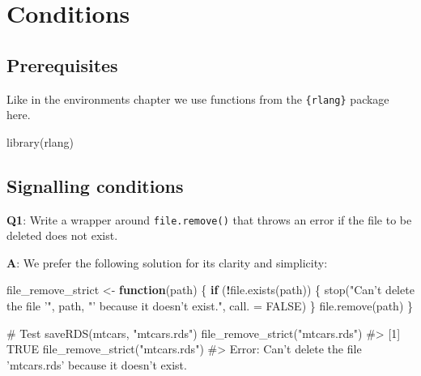 \documentclass[
]{krantz}
\makeatletter
\newenvironment{Shaded}{\begin{snugshade}}{\end{snugshade}}
\newcommand{\CommentTok}[1]{\textcolor[rgb]{0.56,0.35,0.01}{\textit{#1}}}
\newcommand{\ControlFlowTok}[1]{\textcolor[rgb]{0.13,0.29,0.53}{\textbf{#1}}}
\newcommand{\DataTypeTok}[1]{\textcolor[rgb]{0.13,0.29,0.53}{#1}}
\newcommand{\KeywordTok}[1]{\textcolor[rgb]{0.13,0.29,0.53}{\textbf{#1}}}
\newcommand{\NormalTok}[1]{#1}
\newcommand{\OperatorTok}[1]{\textcolor[rgb]{0.81,0.36,0.00}{\textbf{#1}}}
\newcommand{\OtherTok}[1]{\textcolor[rgb]{0.56,0.35,0.01}{#1}}
\newcommand{\StringTok}[1]{\textcolor[rgb]{0.31,0.60,0.02}{#1}}
\newenvironment{kframe}{%
\medskip{}
\setlength{\fboxsep}{.8em}
 \def\at@end@of@kframe{}%
 \ifinner\ifhmode%
  \def\at@end@of@kframe{\end{minipage}}%
  \begin{minipage}{\columnwidth}%
 \fi\fi%
 \def\FrameCommand##1{\hskip\@totalleftmargin \hskip-\fboxsep
 \colorbox{shadecolor}{##1}\hskip-\fboxsep
     \hskip-\linewidth \hskip-\@totalleftmargin \hskip\columnwidth}%
 \MakeFramed {\advance\hsize-\width
   \@totalleftmargin\z@ \linewidth\hsize
   \@setminipage}}%
 {\par\unskip\endMakeFramed%
 \at@end@of@kframe}
\renewenvironment{Shaded}{\begin{kframe}}{\end{kframe}}
\renewcommand{\KeywordTok} [1]{\textcolor[rgb]{0.00,0.44,0.13}{{#1}}}
\renewcommand{\DataTypeTok}[1]{\textcolor[rgb]{0.56,0.13,0.00}{{#1}}}
\renewcommand{\StringTok}  [1]{\textcolor[rgb]{0.25,0.44,0.63}{{#1}}}
\renewcommand{\CommentTok} [1]{\textcolor[rgb]{0.38,0.63,0.69}{{#1}}}
\renewcommand{\OtherTok}   [1]{\textcolor[rgb]{0.00,0.44,0.13}{{#1}}}
\renewcommand{\NormalTok}  [1]{{#1}}
\makeatother
\begin{document}
\hypertarget{conditions}{%
\chapter{Conditions}\label{conditions}}

\hypertarget{prerequisites-2}{%
\section*{Prerequisites}\label{prerequisites-2}}


Like in the environments chapter we use functions from the \texttt{\{rlang\}} package here.

\begin{Shaded}
\begin{Highlighting}[]
\KeywordTok{library}\NormalTok{(rlang)}
\end{Highlighting}
\end{Shaded}


\hypertarget{signalling-conditions}{%
\section{Signalling conditions}\label{signalling-conditions}}

\textbf{{Q1}}: Write a wrapper around \texttt{file.remove()} that throws an error if the file to be deleted does not exist.

\textbf{{A}}: We prefer the following solution for its clarity and simplicity:

\begin{Shaded}
\begin{Highlighting}[]
\NormalTok{file_remove_strict <-}\StringTok{ }\ControlFlowTok{function}\NormalTok{(path) \{}
  \ControlFlowTok{if}\NormalTok{ (}\OperatorTok{!}\KeywordTok{file.exists}\NormalTok{(path)) \{}
    \KeywordTok{stop}\NormalTok{(}\StringTok{"Can't delete the file '"}\NormalTok{, path, }\StringTok{"' because it doesn't exist."}\NormalTok{,}
         \DataTypeTok{call. =} \OtherTok{FALSE}\NormalTok{)}
\NormalTok{  \}}
  \KeywordTok{file.remove}\NormalTok{(path)}
\NormalTok{\}}


\CommentTok{# Test}
\KeywordTok{saveRDS}\NormalTok{(mtcars, }\StringTok{"mtcars.rds"}\NormalTok{)}
\KeywordTok{file_remove_strict}\NormalTok{(}\StringTok{"mtcars.rds"}\NormalTok{)}
\CommentTok{#> [1] TRUE}
\KeywordTok{file_remove_strict}\NormalTok{(}\StringTok{"mtcars.rds"}\NormalTok{)}
\CommentTok{#> Error: Can't delete the file 'mtcars.rds' because it doesn't exist.}
\end{Highlighting}
\end{Shaded}
\end{document}
